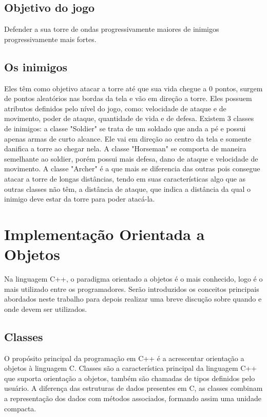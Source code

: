 \documentclass[rel_mlp]{iiufrgs}
\begin{document}
\section{Objetivo do jogo}
Defender a sua torre de ondas progressivamente maiores de inimigos progressivamente mais fortes.

\section{Os inimigos}
Eles têm como objetivo atacar a torre até que sua vida chegue a 0 pontos, surgem de pontos aleatórios nas bordas da tela e vão em direção a torre. Eles possuem atributos definidos pelo nível do jogo, como: velocidade de ataque e de movimento, poder de ataque, quantidade de vida e de defesa.
	Existem 3 classes de inimigos: a classe "Soldier" se trata de um soldado que anda a pé e possui apenas armas de curto alcance. Ele vai em direção ao centro da tela e somente danifica a torre ao chegar nela.
	A classe "Horseman" se comporta de maneira semelhante ao soldier, porém possui mais defesa, dano de ataque e velocidade de movimento.
	A classe "Archer" é a que mais se diferencia das outras pois consegue atacar a torre de longas distâncias, tendo em suas características algo que as outras classes não têm, a distância de ataque, que indica a distância da qual o inimigo deve estar da torre para poder atacá-la. 

\chapter{ Implementação Orientada a Objetos} \label{Implementação OO}
Na linguagem C++, o paradigma orientado a objetos é o mais conhecido, logo é o mais utilizado entre os programadores.
Serão introduzidos os conceitos principais abordados neste trabalho para depois realizar uma breve discução sobre quando e onde devem ser utilizados.
\section{Classes}
O propósito principal da programação em C++ é a acrescentar orientação a objetos à linguagem C. Classes são a característica principal da linguagem C++ que suporta orientação a objetos, também são chamadas de tipos definidos pelo usuário. A diferença das estruturas de dados presentes em C, as classes combinam a representação dos dados com métodos associados, formando assim uma unidade compacta. 
\bigbreak
\end{document}
